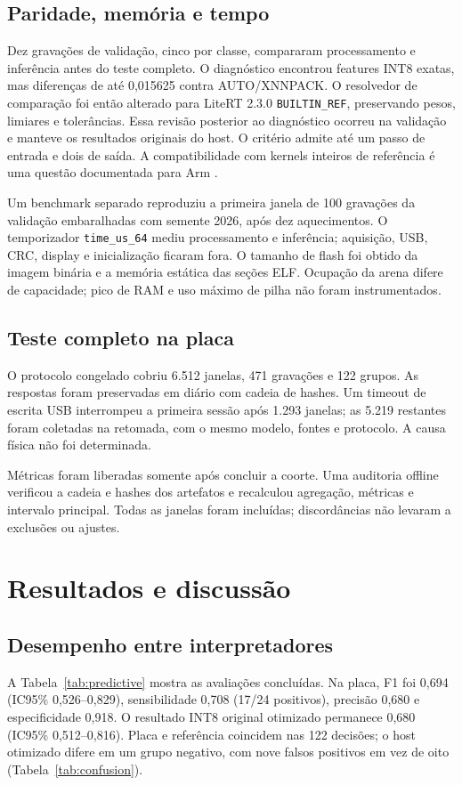 \documentclass[9pt,twocolumn,twoside,lineno]{MSBJournal}
\begin{document}
\subsection{Paridade, memória e tempo}
Dez gravações de validação, cinco por classe, compararam processamento e inferência antes do teste completo. O diagnóstico encontrou features INT8 exatas, mas diferenças de até 0,015625 contra AUTO/XNNPACK. O resolvedor de comparação foi então alterado para LiteRT 2.3.0 \texttt{BUILTIN\_REF}, preservando pesos, limiares e tolerâncias. Essa revisão posterior ao diagnóstico ocorreu na validação e manteve os resultados originais do host. O critério admite até um passo de entrada e dois de saída. A compatibilidade com kernels inteiros de referência é uma questão documentada para Arm \citep{cmsisnn}.

Um benchmark separado reproduziu a primeira janela de 100 gravações da validação embaralhadas com semente 2026, após dez aquecimentos. O temporizador \texttt{time\_us\_64} mediu processamento e inferência; aquisição, USB, CRC, display e inicialização ficaram fora. O tamanho de flash foi obtido da imagem binária e a memória estática das seções ELF. Ocupação da arena difere de capacidade; pico de RAM e uso máximo de pilha não foram instrumentados.

\subsection{Teste completo na placa}
O protocolo congelado cobriu 6.512 janelas, 471 gravações e 122 grupos. As respostas foram preservadas em diário com cadeia de hashes. Um timeout de escrita USB interrompeu a primeira sessão após 1.293 janelas; as 5.219 restantes foram coletadas na retomada, com o mesmo modelo, fontes e protocolo. A causa física não foi determinada.

Métricas foram liberadas somente após concluir a coorte. Uma auditoria offline verificou a cadeia e hashes dos artefatos e recalculou agregação, métricas e intervalo principal. Todas as janelas foram incluídas; discordâncias não levaram a exclusões ou ajustes.

\section{Resultados e discussão}
\subsection{Desempenho entre interpretadores}
A Tabela~\ref{tab:predictive} mostra as avaliações concluídas. Na placa, F1 foi 0,694 (IC95\% 0,526--0,829), sensibilidade 0,708 (17/24 positivos), precisão 0,680 e especificidade 0,918. O resultado INT8 original otimizado permanece 0,680 (IC95\% 0,512--0,816). Placa e referência coincidem nas 122 decisões; o host otimizado difere em um grupo negativo, com nove falsos positivos em vez de oito (Tabela~\ref{tab:confusion}).
\end{document}

